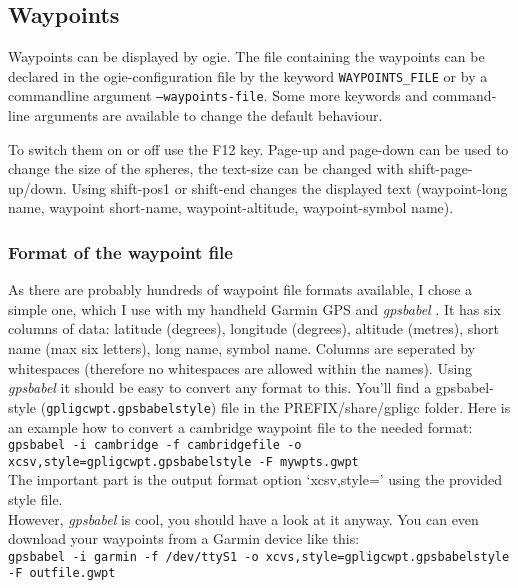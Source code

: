 \subsection{Waypoints}
\label{wp}

Waypoints can be displayed by ogie.
The file containing the waypoints can be declared in the ogie-configuration file by the keyword \texttt{WAYPOINTS\_FILE} or by a commandline argument \texttt{--waypoints-file}. Some more keywords and command-line arguments are available to change the default behaviour.

To switch them on or off use the F12 key. Page-up and page-down can be used to change the size of the spheres, the text-size can be changed with shift-page-up/down. Using shift-pos1 or shift-end changes the displayed text (waypoint-long name, waypoint short-name, waypoint-altitude, waypoint-symbol name).

\subsubsection{Format of the waypoint file}
As there are probably hundreds of waypoint file formats available, I chose a simple one, which I use with my handheld Garmin GPS and \emph{gpsbabel} \cite{gpsbabel}.
It has six columns of data: latitude (degrees), longitude (degrees), altitude (metres), short name (max six letters), long name, symbol name.
Columns are seperated by whitespaces (therefore no whitespaces are allowed within the names).
Using \emph{gpsbabel} it should be easy to convert any format to this.
You'll find a gpsbabel-style (\texttt{gpligcwpt.gpsbabelstyle}) file in the PREFIX/share/gpligc folder.
Here is an example how to convert a cambridge waypoint file to the needed format:\\

\texttt{gpsbabel -i cambridge -f cambridgefile  -o xcsv,style=gpligcwpt.gpsbabelstyle -F mywpts.gwpt}\\
The important part is the output format option `xcsv,style=' using the provided style file.\\
However, \emph{gpsbabel} is cool, you should have a look at it anyway.
You can even download your waypoints from a Garmin device like this:\\
\texttt{gpsbabel -i garmin -f /dev/ttyS1 -o xcvs,style=gpligcwpt.gpsbabelstyle -F outfile.gwpt}
